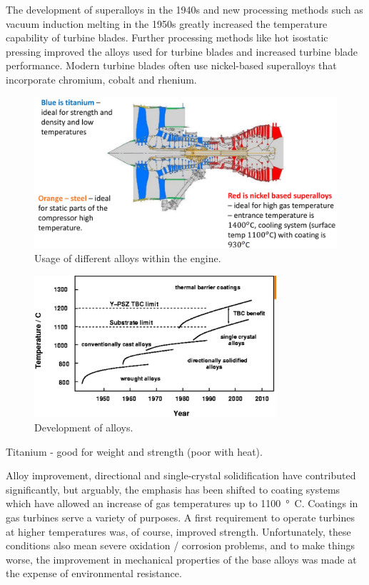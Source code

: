 The development of superalloys in the 1940s and new processing methods such as vacuum induction melting in the 1950s greatly increased the temperature capability of turbine blades. Further processing methods like hot isostatic pressing improved the alloys used for turbine blades and increased turbine blade performance. Modern turbine blades often use nickel-based superalloys that incorporate chromium, cobalt and rhenium.
\begin{figure}[H]
    \centering
    \includegraphics[width =\textwidth]{img/figure23.png}
    \caption{Usage of different alloys within the engine.}
\end{figure}
\begin{figure}[H]
    \centering
    \includegraphics[width =0.8\textwidth]{img/figure24.png}
    \caption{Development of alloys.}
\end{figure}
Titanium - good for weight and strength (poor with heat).

Alloy improvement, directional and single-crystal solidification have contributed significantly, but arguably, the emphasis has been shifted to coating systems which have allowed an increase of gas temperatures up to \SI{1100}{\degree C}. Coatings in gas turbines serve a variety of purposes. A first requirement to operate turbines at higher temperatures was, of course, improved strength. Unfortunately, these conditions also mean severe oxidation / corrosion problems, and to make things worse, the improvement in mechanical properties of the base alloys was made at the expense of environmental resistance.

